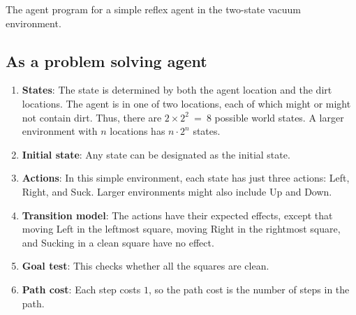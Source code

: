 \begin{algorithm}[H]
    \caption{The agent program for a simple reflex agent in the two-state vacuum environment.  \cite{ai/book/Artificial-Intelligence-A-Modern-Approach/Russell-Norvig}}

\end{algorithm}







\subsection{As a problem solving agent}

\begin{enumerate}
    \item \textbf{States}: The state is determined by both the agent location and the dirt locations. The agent is in one of two locations, each of which might or might not contain dirt. Thus, there are $2 \times 2^2\ =\ 8$ possible world states. A larger environment with $n$ locations has $n \cdot 2^n$ states.

    \item \textbf{Initial state}: Any state can be designated as the initial state.

    \item \textbf{Actions}: In this simple environment, each state has just three actions: Left, Right, and Suck. Larger environments might also include Up and Down.

    \item \textbf{Transition model}: The actions have their expected effects, except that moving Left in the leftmost square, moving Right in the rightmost square, and Sucking in a clean square have no effect.

    \item \textbf{Goal test}: This checks whether all the squares are clean.

    \item \textbf{Path cost}: Each step costs $1$, so the path cost is the number of steps in the path.
\end{enumerate}

